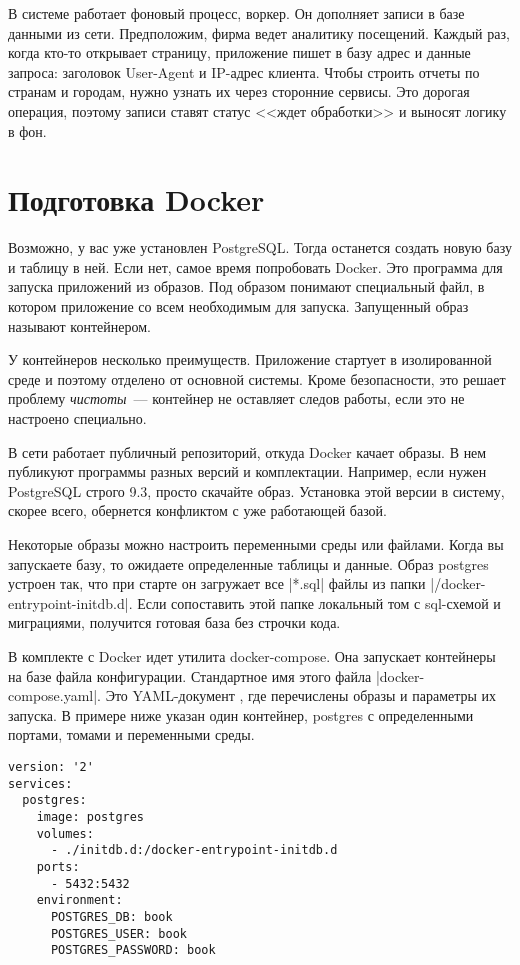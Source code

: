 В системе работает фоновый процесс, воркер. Он дополняет записи в базе данными
из сети. Предположим, фирма ведет аналитику посещений. Каждый раз, когда кто-то
открывает страницу, приложение пишет в базу адрес и данные запроса: заголовок
User-Agent и IP-адрес клиента. Чтобы строить отчеты по странам и городам, нужно
узнать их через сторонние сервисы. Это дорогая операция, поэтому записи ставят
статус <<ждет обработки>> и выносят логику в фон.

\section{Подготовка Docker}

Возможно, у вас уже установлен PostgreSQL. Тогда останется создать новую базу и
таблицу в ней. Если нет, самое время попробовать Docker. Это программа для
запуска приложений из образов. Под образом понимают специальный файл, в котором
приложение со всем необходимым для запуска. Запущенный образ называют
контейнером.

У контейнеров несколько преимуществ. Приложение стартует в изолированной среде и
поэтому отделено от основной системы. Кроме безопасности, это решает проблему
\emph{чистоты}~--- контейнер не оставляет следов работы, если это не настроено
специально.

В сети работает публичный репозиторий, откуда Docker качает образы. В нем
публикуют программы разных версий и комплектации. Например, если нужен
PostgreSQL строго 9.3, просто скачайте образ. Установка этой версии в систему,
скорее всего, обернется конфликтом с уже работающей базой.


Некоторые образы можно настроить переменными среды или файлами. Когда вы
запускаете базу, то ожидаете определенные таблицы и данные. Образ postgres
устроен так, что при старте он загружает все \spverb|*.sql| файлы из папки
\spverb|/docker-entrypoint-initdb.d|. Если сопоставить этой папке локальный том
с sql-схемой и миграциями, получится готовая база без строчки кода.

В комплекте с Docker идет утилита docker-compose. Она запускает контейнеры на
базе файла конфигурации. Стандартное имя этого файла \spverb|docker-compose.yaml|. Это
YAML-документ , где перечислены образы и параметры их запуска. В примере ниже
указан один контейнер, postgres с определенными портами, томами и переменными
среды.

\begin{verbatim}
version: '2'
services:
  postgres:
    image: postgres
    volumes:
      - ./initdb.d:/docker-entrypoint-initdb.d
    ports:
      - 5432:5432
    environment:
      POSTGRES_DB: book
      POSTGRES_USER: book
      POSTGRES_PASSWORD: book
\end{verbatim}

